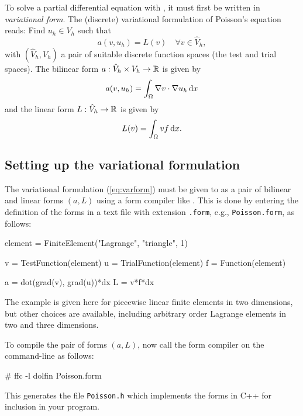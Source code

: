
To solve a partial differential equation with \dolfin{}, it must first
be written in \emph{variational form}.  The (discrete) variational
formulation of Poisson's equation reads: Find $u_h \in V_h$ such that
\begin{equation} \label{eq:varform}
  a(v, u_h) = L(v) \quad \forall v\in \hat{V}_h, 
\end{equation}
with $(\hat{V}_h, V_h)$ a pair of suitable discrete function spaces
(the test and trial spaces). The bilinear form $a : \hat{V}_h \times V_h
\rightarrow \mathbb{R}$ is given by
\begin{equation}
  a(v, u_h) = \int_{\Omega} \nabla v \cdot \nabla u_h \, \mathrm{d}x
\end{equation}
and the linear form $L : \hat{V}_h \rightarrow \mathbb{R}$ is given by
\begin{equation}
  L(v) = \int_{\Omega} v f \, \mathrm{d}x.
\end{equation}

\subsection{Setting up the variational formulation}

The variational formulation (\ref{eq:varform}) must be given to
\dolfin{} as a pair of bilinear and linear forms $(a, L)$ using a
form compiler like \ffc{}. This is done by entering the definition of
the forms in a text file with extension \texttt{.form},
e.g., \texttt{Poisson.form}, as follows:
\begin{code}
element = FiniteElement("Lagrange", "triangle", 1)

v = TestFunction(element)
u = TrialFunction(element)
f = Function(element)

a = dot(grad(v), grad(u))*dx
L = v*f*dx
\end{code}

The example is given here for piecewise linear finite elements in two
dimensions, but other choices are available, including arbitrary order
Lagrange elements in two and three dimensions.

To compile the pair of forms $(a, L)$, now call the form compiler on
the command-line as follows:
\begin{code}
# ffc -l dolfin Poisson.form
\end{code}
This generates the file \texttt{Poisson.h} which implements the forms
in C++ for inclusion in your \dolfin{} program.

